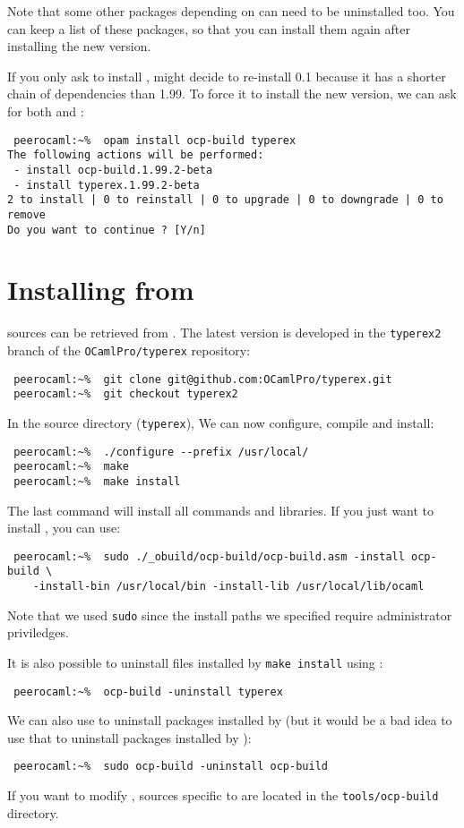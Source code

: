 Note that some other packages depending on \ocpbuild{} can need to be
uninstalled too. You can keep a list of these packages, so that you
can install them again after installing the new version.

If you only ask \opam{} to install \ocpbuild{}, \opam{} might decide
to re-install \ocpbuild{} 0.1 because it has a shorter chain of
dependencies than \ocpbuild{} 1.99. To force it to install the new
version, we can ask for both \ocpbuild{} and \typerex{}:
\begin{verbatim}
 peerocaml:~%  opam install ocp-build typerex
The following actions will be performed:
 - install ocp-build.1.99.2-beta
 - install typerex.1.99.2-beta
2 to install | 0 to reinstall | 0 to upgrade | 0 to downgrade | 0 to remove
Do you want to continue ? [Y/n]
\end{verbatim}

\section{Installing from \github{}}

\ocpbuild{} sources can be retrieved from \github{}. The latest
version is developed in the {\tt typerex2} branch of the {\tt OCamlPro/typerex}
repository:

\begin{verbatim}
 peerocaml:~%  git clone git@github.com:OCamlPro/typerex.git
 peerocaml:~%  git checkout typerex2
\end{verbatim}

In the source directory ({\tt typerex}), We can now configure, compile
and install:
\begin{verbatim}
 peerocaml:~%  ./configure --prefix /usr/local/
 peerocaml:~%  make
 peerocaml:~%  make install
\end{verbatim}

The last command will install all \typerex{} commands and
libraries. If you just want to install \ocpbuild{}, you can use:

\begin{verbatim}
 peerocaml:~%  sudo ./_obuild/ocp-build/ocp-build.asm -install ocp-build \
    -install-bin /usr/local/bin -install-lib /usr/local/lib/ocaml
\end{verbatim}

Note that we used {\tt sudo} since the install paths we specified
require administrator priviledges.

It is also possible to uninstall files installed by {\tt make install}
using \ocpbuild{}:
\begin{verbatim}
 peerocaml:~%  ocp-build -uninstall typerex
\end{verbatim}

We can also use \ocpbuild{} to uninstall packages installed by
\ocpbuild{} (but it would be a bad idea to use that to uninstall
packages installed by \opam{}):
\begin{verbatim}
 peerocaml:~%  sudo ocp-build -uninstall ocp-build
\end{verbatim}


If you want to modify \ocpbuild{}, sources specific to \ocpbuild{} are
located in the {\tt tools/ocp-build} directory.
